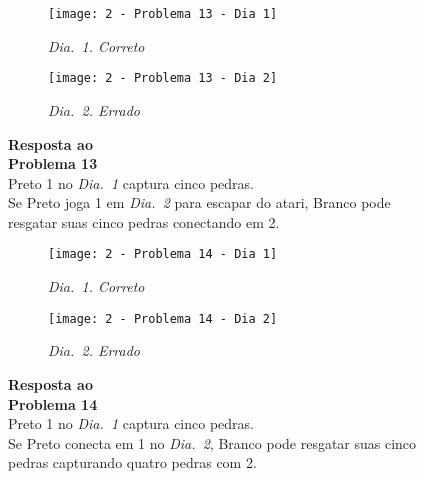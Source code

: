 \begin{SCfigure}[][h!]
    \begin{subfigure}[t]{.31\textwidth}
        \texttt{[image: 2 - Problema 13 - Dia 1]}
        \caption*{\emph{Dia.\@~1. Correto}}
    \end{subfigure}
    \hfill
    \begin{subfigure}[t]{.31\textwidth}
        \texttt{[image: 2 - Problema 13 - Dia 2]}
        \caption*{\emph{Dia.\@~2. Errado}}
    \end{subfigure}
    \hfill
    \caption*{\textbf{Resposta ao\\Problema 13}\\\vspace*{.25cm}Preto 1 no \emph{Dia.\@~1} captura cinco pedras.\\\vspace*{.25cm}Se Preto joga 1 em \emph{Dia.\@~2} para escapar do atari, Branco pode resgatar suas cinco pedras conectando em 2.}
\end{SCfigure}

\vfill

\begin{SCfigure}[][h!]
    \begin{subfigure}[t]{.31\textwidth}
        \texttt{[image: 2 - Problema 14 - Dia 1]}
        \caption*{\emph{Dia.\@~1. Correto}}
    \end{subfigure}
    \hfill
    \begin{subfigure}[t]{.31\textwidth}
        \texttt{[image: 2 - Problema 14 - Dia 2]}
        \caption*{\emph{Dia.\@~2. Errado}}
    \end{subfigure}
    \hfill
    \caption*{\textbf{Resposta ao\\Problema 14}\\\vspace*{.25cm}Preto 1 no \emph{Dia.\@~1} captura cinco pedras.\\\vspace*{.25cm}Se Preto conecta em 1 no \emph{Dia.\@~2}, Branco pode resgatar suas cinco pedras capturando quatro pedras com 2.}
\end{SCfigure}

\vfill

